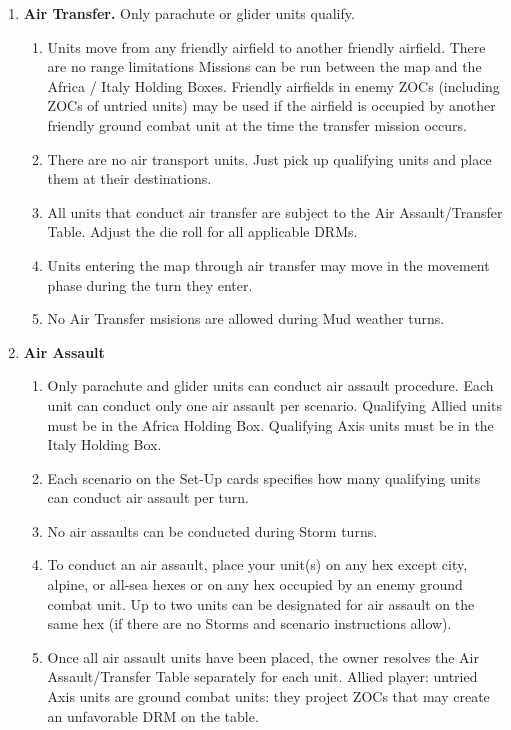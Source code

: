 \begin{enumerate}[label=\alph*.]
    \item \textbf{Air Transfer.} Only parachute or glider units qualify.
    \begin{enumerate}[label=\arabic*)]
        \item Units move from any friendly airfield to another friendly airfield. There are no range limitations Missions can be run between the map and the Africa / Italy Holding Boxes. Friendly airfields in enemy ZOCs (including ZOCs of untried units) may be used if the airfield is occupied by another friendly ground combat unit at the time the transfer mission occurs.
        \item There are no air transport units. Just pick up qualifying units and place them at their destinations.
        \item All units that conduct air transfer are subject to the Air Assault/Transfer Table. Adjust the die roll for all applicable DRMs.
        \item Units entering the map through air transfer may move in the movement phase during the turn they enter.
        \item No Air Transfer msisions are allowed during Mud weather turns.
    \end{enumerate}
    \item \textbf{Air Assault}
    \begin{enumerate}[label=\arabic*)]
        \item Only parachute and glider units can conduct air assault procedure. Each unit can conduct only one air assault per scenario. Qualifying Allied units must be in the Africa Holding Box. Qualifying Axis units must be in the Italy Holding Box.
        \item Each scenario on the Set-Up cards specifies how many qualifying units can conduct air assault per turn.
        \item No air assaults can be conducted during Storm turns.
        \item To conduct an air assault, place your unit(s) on any hex except city, alpine, or all-sea hexes or on any hex occupied by an enemy ground combat unit. Up to two units can be designated for air assault on the same hex (if there are no Storms and scenario instructions allow).
        \item Once all air assault units have been placed, the owner resolves the Air Assault/Transfer Table separately for each unit. Allied player: untried Axis units are ground combat units: they project ZOCs that may create an unfavorable DRM on the table.

\end{enumerate}
\end{enumerate}
